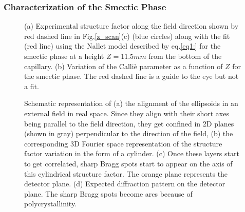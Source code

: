 \documentclass[aps,prl,preprint,superscriptaddress]{revtex4-1}
\begin{document}
\subsubsection{Characterization of the Smectic Phase}
\begin{figure}[ht]
\caption{(a) Experimental structure factor along the field direction shown by red dashed line in Fig.\ref{z_scan}(c) (blue circles) along with the fit (red line) using the Nallet model described by eq.\ref{eq1:} for the smectic phase at a height $Z=11.5mm$ from the bottom of the capillary. (b) Variation of the Calli\`{e} parameter as a function of $Z$ for the smectic phase. The red dashed line is a guide to the eye but not a fit.}
\label{callie}
\end{figure}
\begin{figure}[ht]
\caption{Schematic representation of (a) the alignment of the ellipsoids in an external field in real space. Since they align with their short axes being parallel to the field direction, they get confined in 2D planes (shown in gray) perpendicular to the direction of the field, (b) the corresponding 3D Fourier space representation of the structure factor variation in the form of a cylinder. (c) Once these layers start to get correlated, sharp Bragg spots start to appear on the axis of this cylindrical structure factor. The orange plane represents the detector plane. (d) Expected diffraction pattern on the detector plane. The sharp Bragg spots become arcs because of polycrystallinity.}
\label{Fspace_smectic}
\end{figure} 
\end{document}
